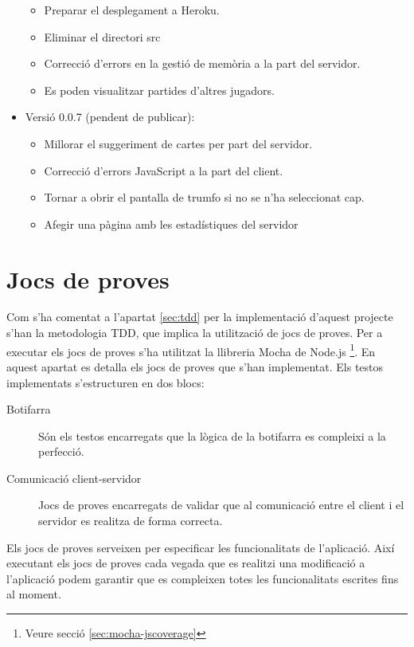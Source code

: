 \begin{itemize}
{\begin{itemize}
        \item{Preparar el desplegament a Heroku.}
        \item{Eliminar el directori src}
        \item{Correcció d'errors en la gestió de memòria a la part del servidor.}
        \item{Es poden visualitzar partides d'altres jugadors.}
    \end{itemize}
}
\item{Versió 0.0.7 (pendent de publicar):
    \begin{itemize}
        \item{Millorar el suggeriment de cartes per part del servidor.}
        \item{Correcció d'errors JavaScript a la part del client.}
        \item{Tornar a obrir el pantalla de trumfo si no se n'ha seleccionat cap. }
        \item{Afegir una pàgina amb les estadístiques del servidor}
    \end{itemize}
}
\end{itemize}

\section{Jocs de proves}

Com s'ha comentat a l'apartat \ref{sec:tdd} per la implementació d'aquest projecte s'han la metodologia TDD, que implica la utilització de jocs de proves. Per a executar els jocs de proves s'ha utilitzat la llibreria Mocha de Node.js \footnote{Veure secció \ref{sec:mocha-jscoverage}}. En aquest apartat es detalla els jocs de proves que s'han implementat. Els testos implementats s'estructuren en dos blocs: 

\begin{description}
    \item[Botifarra]{ Són els testos encarregats que la lògica de la botifarra es compleixi a la perfecció.}
    \item[Comunicació client-servidor] {Jocs de proves encarregats de validar que al comunicació entre el client i el servidor es realitza de forma correcta.}
\end{description}

Els jocs de proves serveixen per especificar les funcionalitats de l'aplicació. Així executant els jocs de proves cada vegada que es realitzi una modificació a l'aplicació podem garantir que es compleixen totes les funcionalitats escrites fins al moment.

